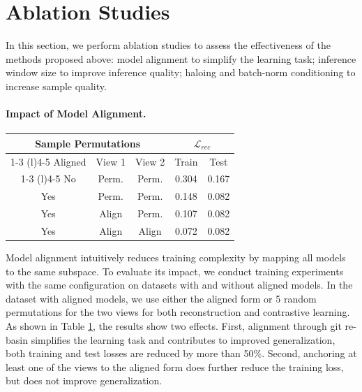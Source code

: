 \section{Ablation Studies}
\label{sec:ablation}
In this section, we perform ablation studies to assess the effectiveness of the methods proposed above: 
model alignment to simplify the learning task; 
inference window size to improve inference quality; 
haloing and batch-norm conditioning to increase sample quality.
\paragraph{Impact of Model Alignment.}
\begin{table}
\vspace{-8mm}
\label{tab:ablation_alignment}
\small
\setlength{\tabcolsep}{6pt}
\begin{tabularx}{1.0\linewidth}{ccccc}
\toprule
\multicolumn{3}{c}{Sample Permutations} & \multicolumn{2}{c}{$\mathcal{L}_{rec}$} \\
\cmidrule(r){1-3} \cmidrule(l){4-5}
Aligned    & View 1       & View 2       & Train              & Test               \\
\cmidrule(r){1-3} \cmidrule(l){4-5}
No         & Perm.     & Perm.    & 0.304              & 0.167              \\
Yes        & Perm.     & Perm.    & 0.148              & 0.082              \\
Yes        & Align    & Perm.    & 0.107              & 0.082              \\
Yes        & Align    & Align   & 0.072              & 0.082              \\ 
\bottomrule
\end{tabularx}
\vspace{-4mm}
\end{table} 
Model alignment intuitively reduces training complexity by mapping all models to the same subspace. To evaluate its impact, we conduct training experiments with the same configuration on datasets with and without aligned models. In the dataset with aligned models, we use either the aligned form or 5 random permutations for the two views for both reconstruction and contrastive learning.
As shown in Table \ref{tab:ablation_alignment}, the results show two effects. 
First, alignment through git re-basin simplifies the learning task and contributes to improved generalization, both training and test losses are reduced by more than 50\%. 
Second, anchoring at least one of the views to the aligned form does further reduce the training loss, but does not improve generalization.

